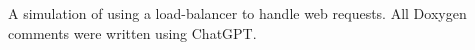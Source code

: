 A simulation of using a load-\/balancer to handle web requests. All Doxygen comments were written using Chat\+G\+PT. 